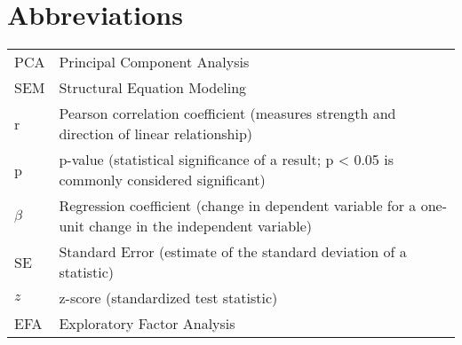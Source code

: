 \section*{Abbreviations}
\begin{tabular}{p{}p{}}
    PCA & Principal Component Analysis \\
    SEM & Structural Equation Modeling \\
    r & Pearson correlation coefficient (measures strength and direction of linear relationship) \\
    p & p-value (statistical significance of a result; p < 0.05 is commonly considered significant) \\
    $\beta$ & Regression coefficient (change in dependent variable for a one-unit change in the independent variable) \\
    SE & Standard Error (estimate of the standard deviation of a statistic) \\
    $z$ & z-score (standardized test statistic) \\
    EFA & Exploratory Factor Analysis \\
\end{tabular}